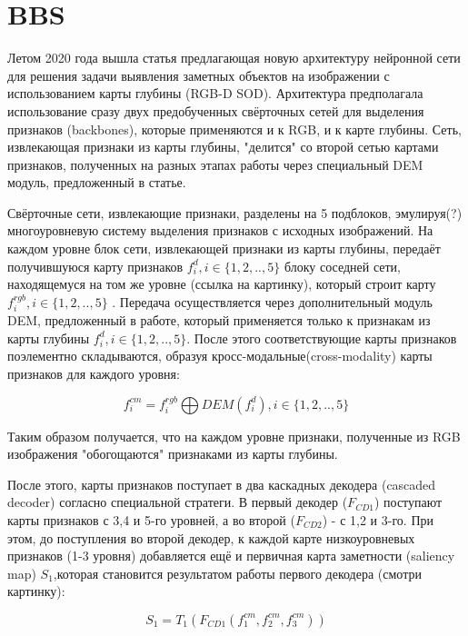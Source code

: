 \section{BBS}


Летом 2020 года вышла статья \cite{BBS} предлагающая новую архитектуру нейронной сети для решения задачи выявления заметных объектов на изображении 
с использованием карты глубины (RGB-D SOD). Архитектура предполагала использование сразу двух предобученных свёрточных сетей
для выделения признаков (backbones), которые применяются и к RGB, и к карте глубины. Сеть, извлекающая признаки
из карты глубины, "делится" со второй сетью картами признаков, полученных на разных этапах работы через специальный DEM модуль, 
предложенный в статье. 


Свёрточные сети, извлекающие признаки, разделены на 5 подблоков, эмулируя(?) многоуровневую систему выделения признаков с исходных изображений.
На каждом уровне блок сети, извлекающей признаки из карты глубины, передаёт получившуюся карту признаков $f_i^d, i \in \{1,2,..,5\}$ блоку соседней сети, 
находящемуся на том же уровне (ссылка на картинку), который строит карту $f_i^{rgb}, i \in \{1,2,..,5\}$ . Передача осуществляется через дополнительный модуль DEM, предложенный в работе,
который применяется только к признакам из карты глубины $f_i^d, i \in \{1,2,..,5\}$. 
После этого соответствующие карты признаков поэлементно складываются, образуя кросс-модальные(cross-modality) карты признаков для каждого уровня:

\begin{equation}
    f_i^{cm} = f_i^{rgb} \bigoplus DEM(f_i^{d}), i \in \{1,2,..,5\}
    \label{eq:DEM}
\end{equation}

Таким образом получается, что на каждом уровне признаки, полученные из RGB изображения "обогощаются" признаками из карты глубины.


После этого, карты признаков поступает в два каскадных декодера (cascaded decoder) согласно специальной стратеги. В первый декодер ($F_{CD1}$)
поступают карты признаков с 3,4 и 5-го уровней, а во второй  ($F_{CD2}$) - с 1,2 и 3-го. При этом, до поступления во второй декодер, к каждой карте низкоуровневых 
признаков (1-3 уровня) добавляется ещё и первичная карта заметности (saliency map) $S_1$,которая становится результатом работы первого декодера (смотри картинку):

\begin{equation}
    S_1 = T_1(F_{CD1}(f_1^{cm},f_2^{cm},f_3^{cm}))
\end{equation}

